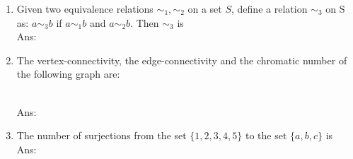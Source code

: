 \documentclass[10pt, letterpaper]{article}
\newcommand{\eat}[1]{}
\begin{document}
\begin{enumerate}\item Given two equivalence relations $\sim_1, \sim_2$ on a set $S$, define a relation $\sim_3$ on S as: $a \sim_3 b$ if $a \sim_1 b$ and $a \sim_2 b$. Then $\sim_3$ is\\
Ans:

\begin{enumerate*}\item  4		
	
\item  2 		
	
\item  3		
	
\item  1		
	
\item  5 \eat{*}

\end{enumerate*}


\item The vertex-connectivity, the edge-connectivity and the chromatic number of the following graph are:
\begin{figure*}[h]
\centering
\end{figure*}\\
Ans:



\item The number of surjections from the set $\{1, 2, 3, 4, 5 \}$ to the set $\{a, b, c\}$ is\\
Ans:

\end{enumerate}
\end{document}
